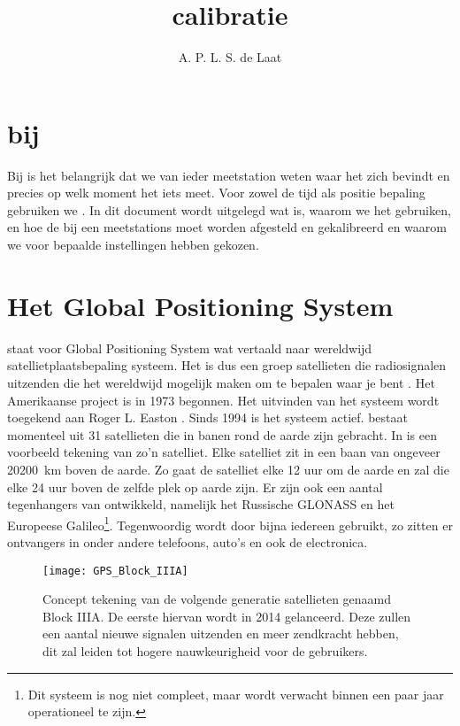 



\title{\gps calibratie}
\author{A. P. L. S. de Laat}
\date{}

\maketitle

\section{\gps bij \hisparc}\label{sec:gps_hisparc}

Bij \hisparc is het belangrijk dat we van ieder meetstation weten waar
het zich bevindt en precies op welk moment het iets meet. Voor zowel de
tijd als positie bepaling gebruiken we \gps. In dit document wordt
uitgelegd wat \gps is, waarom we het gebruiken, en hoe de \gps bij een
\hisparc meetstations moet worden afgesteld en gekalibreerd en waarom we
voor bepaalde instellingen hebben gekozen.


\section{Het Global Positioning System}\label{sec:gps}

\gps staat voor Global Positioning System wat vertaald naar wereldwijd
satellietplaatsbepaling systeem. Het is dus een groep satellieten die
radiosignalen uitzenden die het wereldwijd mogelijk maken om te bepalen
waar je bent \cite{gps2013gov}. Het Amerikaanse project is in 1973
begonnen. Het uitvinden van het systeem wordt toegekend aan Roger L.
Easton \cite{easton2006who}. Sinds 1994 is het systeem actief. \gps
bestaat momenteel uit 31 satellieten die in banen rond de aarde zijn
gebracht. In  is een voorbeeld tekening van
zo'n \gps satelliet. Elke \gps satelliet zit in een baan van ongeveer
\SI{20200}{\kilo\meter} boven de aarde. Zo gaat de satelliet elke 12 uur
om de aarde en zal die elke 24 uur boven de zelfde plek op aarde zijn.
Er zijn ook een aantal tegenhangers van \gps ontwikkeld, namelijk het
Russische GLONASS en het Europeese Galileo\footnote{Dit systeem is nog
niet compleet, maar wordt verwacht binnen een paar jaar operationeel te
zijn.}. Tegenwoordig wordt \gps door bijna iedereen gebruikt, zo zitten
er \gps ontvangers in onder andere telefoons, auto's en ook de \hisparc
electronica.

\begin{figure}
    \centering
    \texttt{[image: GPS\_Block\_IIIA]}
    \caption{Concept tekening van de volgende generatie \gps satellieten
    genaamd \gps Block IIIA. De eerste hiervan wordt in 2014 gelanceerd.
    Deze zullen een aantal nieuwe signalen uitzenden en meer zendkracht
    hebben, dit zal leiden tot hogere nauwkeurigheid voor de gebruikers.}
    \label{fig:GPSBlockIIIA}
\end{figure}

